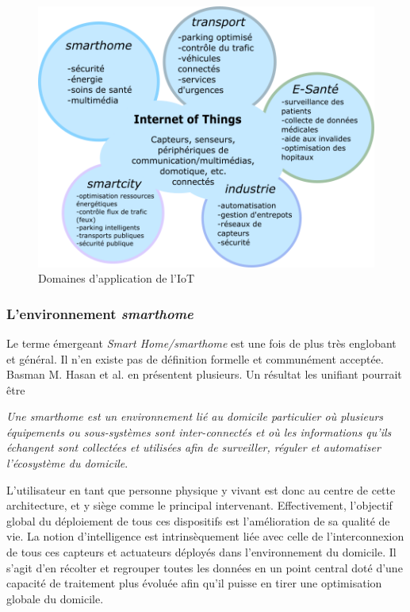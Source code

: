 \documentclass[]{article}
\begin{document}
\begin{figure}[!h]
\centering
\includegraphics[width=0.6\linewidth]{IoT_domains.png}
\caption{Domaines d'application de l'IoT}
\label{domains_IoT}
\end{figure}

\newpage

\subsubsection{L'environnement \textit{smarthome}}
\par Le terme émergeant \textit{Smart Home/smarthome} est une fois de plus très englobant et général. Il n'en existe pas de définition formelle et communément acceptée. Basman M. Hasan et al. \cite{Basman2016} en présentent plusieurs. Un résultat les unifiant pourrait être
\begin{center}
 \textit{\og Une smarthome est un environnement lié au domicile particulier où plusieurs équipements ou sous-systèmes sont inter-connectés et où les informations qu'ils échangent sont collectées et utilisées afin de surveiller, réguler et automatiser l'écosystème du domicile\fg{}}.\\
\end{center}

\par L'utilisateur en tant que personne physique y vivant est donc au centre de cette architecture, et y siège comme le principal intervenant. Effectivement, l'objectif global du déploiement de tous ces dispositifs est l'amélioration de sa qualité de vie. La notion d'intelligence est intrinsèquement liée avec celle de l'interconnexion de tous ces capteurs et actuateurs déployés dans l'environnement du domicile. Il s'agit d'en récolter et regrouper toutes les données en un point central doté d'une capacité de traitement plus évoluée afin qu'il puisse en tirer une optimisation globale du domicile.\\
\end{document}
